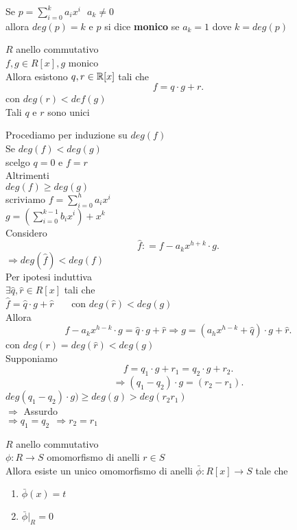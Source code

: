 \documentclass{article}
\begin{document}
Se $p = \sum^{k}_{i=0}a_ix^i \ \ \ a_k\neq 0$\\
allora $deg(p) = k$ e  $p$ si dice  \textbf{monico} se $a_k = 1$ dove $k = deg(p)$\\
\begin{teo}
	$R$ anello commutativo\\
	$f,g\in R[x], g$ monico\\
	Allora esistono $q,r\in\mathbb{R}[x]$ tali che 
	 \[
	f = q\cdot g + r
	.\] 
	con $deg(r) < def(g)$\\
	Tali $q$ e $r$ sono unici
\end{teo}
\begin{dimo}
	Procediamo per induzione su $deg(f)$\\
	Se  $deg(f) < deg (g)$\\
	scelgo  $q = 0$ e $f = r$\\
	Altrimenti  \\
	$deg(f) \geq deg(g)$\\
	scriviamo $f = \sum^{h}_{i=0  }a_ix^i$\\
	$g =  \left( \sum^{k-1}_{i=0}b_ix^i \right) + x^k$\\
	Considero\\
	\[
		\hat f : = f - a_kx^{h + k}\cdot g
	.\] 
	$ \Rightarrow deg(\hat f) < deg (f)$\\
	Per ipotesi induttiva\\
	$\exists \hat q, \hat r\in R[x]$ tali che\\
	$\hat f = \hat q \cdot g + \hat r$ \ \ \ con  $deg(\hat r) < deg(g)$\\
	Allora\\
	\[
		f  - a_kx^{h-k}\cdot g = \hat q\cdot g + \hat r \Rightarrow g = (a_hx^{h-k} + \hat q)\cdot g + \hat r
	.\] 
	con $deg(r) = deg(\hat r) < deg(g)$\\
	Supponiamo\\
	 \[
	f = q_1\cdot g + r_1 = q_2\cdot g + r_2
	.\] 
	\[
	\Rightarrow  (q_1-q_2)\cdot g = (r_2-r_1)
	.\] 
	$deg(q_1-q_2)\cdot g) \geq deg(g) > deg(r_2r_1)$\\
	$ \Rightarrow $ Assurdo\\
	$ \Rightarrow q_1=q_2 \ \ \Rightarrow r_2= r_1$
\end{dimo}
\begin{teo}
	$R$ anello commutativo\\
	$\phi: R \rightarrow S$ omomorfismo di anelli $r\in S$\\
	Allora esiste un unico omomorfismo di anelli  $\bar \phi: R[x] \rightarrow S$ tale che
\begin{enumerate}
	\item $\bar\phi(x) = t$\\
	\item $\bar\phi|_R = 0$
\end{enumerate}
\end{teo}
\end{document}
